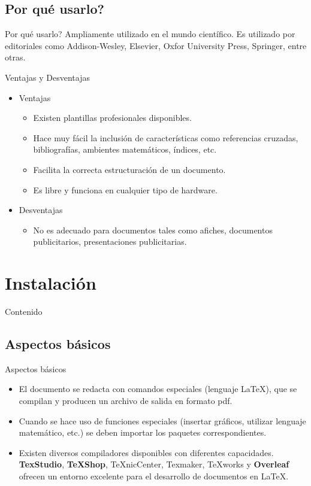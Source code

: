 \documentclass[dvipsnames,xcolor, handout]{beamer}
\theoremstyle{plain}
\theoremstyle{definition}
\begin{document}
\subsection{\textquestiondown Por qué usarlo?}
\begin{frame}{\textquestiondown Por qué usarlo?}
Ampliamente utilizado en el mundo científico. Es utilizado
por editoriales como Addison-Wesley, Elsevier, Oxfor University Press, Springer, entre otras.
\end{frame}
\begin{frame}{Ventajas y Desventajas}
    \begin{itemize}
        \item Ventajas
        \begin{itemize}
            \item Existen plantillas profesionales disponibles.
            \item Hace muy fácil la inclusión de características como referencias cruzadas, bibliografías, ambientes matemáticos, índices, etc.
            \item Facilita la correcta estructuración de un documento.
            \item Es libre y funciona en cualquier tipo de hardware.
        \end{itemize}
        \item Desventajas
        \begin{itemize}
            \item No es adecuado para documentos tales como afiches, documentos publicitarios, presentaciones publicitarias.
        \end{itemize}
    \end{itemize}
\end{frame}

\section{Instalación}
\begin{frame}{Contenido}
  \tableofcontents[currentsection]%
\end{frame}
\subsection{Aspectos básicos}
\begin{frame}{Aspectos básicos}
\begin{itemize}
    \item El documento se redacta con comandos especiales (lenguaje \LaTeX), que se compilan y producen un archivo de salida en formato pdf. \pause
    \item Cuando se hace uso de funciones especiales (insertar gráficos, utilizar lenguaje matemático, etc.) se deben importar los paquetes correspondientes. \pause
    \item Existen diversos compiladores disponibles con diferentes capacidades. \textbf{TexStudio}, \textbf{TeXShop}, TeXnicCenter, Texmaker, TeXworks y \textbf{Overleaf} ofrecen un entorno excelente para el desarrollo de documentos en \LaTeX.
\end{itemize}
\end{frame}
\end{document}
